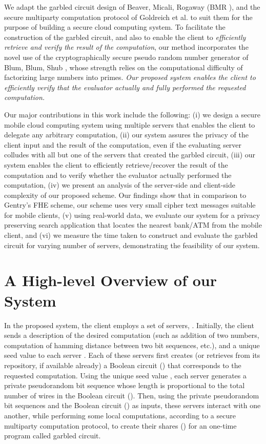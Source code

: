 \documentclass[10pt,journal,cspaper,compsoc]{IEEEtran}
\begin{document}
We adapt the garbled circuit design of Beaver, Micali, Rogaway (BMR \cite{beaver90,rogaway91}), and the secure multiparty computation protocol of Goldreich et al. \cite{goldreich04,goldreich87} to suit them for the purpose of building a secure cloud computing system. To facilitate the construction of the garbled circuit, and also to enable the client to {\em efficiently retrieve and verify the result of the computation}, our method incorporates the novel use of the cryptographically secure pseudo random number generator of Blum, Blum, Shub \cite{blum86,schneier95}, whose strength relies on the computational difficulty of factorizing large numbers into primes. {\em Our proposed system enables the client to efficiently verify that the evaluator actually and fully performed the requested computation.}


Our major contributions in this work include the following: (i) we design a secure mobile cloud computing system using multiple servers that enables the client to delegate any arbitrary computation, (ii) our system assures the privacy of the client input and the result of the computation, even if the evaluating server colludes with all but one of the servers that created the garbled circuit, (iii) our system enables the client to efficiently retrieve/recover the result of the computation and to verify whether the evaluator actually performed the computation, (iv) we present an analysis of the server-side and client-side complexity of our proposed scheme. Our findings show that in comparison to Gentry's FHE scheme, our scheme uses very small cipher text messages suitable for mobile clients, (v) using real-world data, we evaluate our system for a privacy preserving search application that locates the nearest bank/ATM from the mobile client, and (vi) we measure the time taken to construct and evaluate the garbled circuit for varying number of servers, demonstrating the feasibility of our system.\vspace{-2 mm}


 \section{A High-level Overview of our\\ System}


In the proposed system, the client employs a set of  servers, . Initially, the client sends a description of the desired computation (such as addition of two numbers, computation of hamming distance between two bit sequences, etc.), and a unique seed value  to each server . Each of these  servers first creates (or retrieves from its repository, if available already) a Boolean circuit () that corresponds to the requested computation. Using the unique seed value , each server  generates a private pseudorandom bit sequence whose length is proportional to the total number of wires in the Boolean circuit (). Then, using the private pseudorandom bit sequences and the Boolean circuit () as inputs, these  servers interact with one another, while performing some local computations, according to a secure multiparty computation protocol, to create their shares () for an one-time program called garbled circuit.
\end{document}
